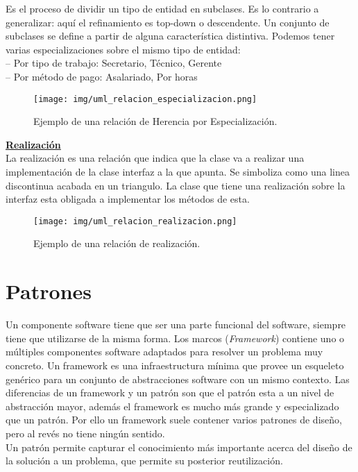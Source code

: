\documentclass[10pt,a4paper,titlepage]{article}
\begin{document}
Es el proceso de dividir un tipo de entidad en subclases. Es lo contrario a generalizar: aquí el refinamiento es top-down o descendente. Un conjunto de subclases se define a partir de alguna característica distintiva. Podemos tener varias especializaciones sobre el mismo tipo de entidad:\\
– Por tipo de trabajo: Secretario, Técnico, Gerente\\
– Por método de pago: Asalariado, Por horas

\begin{figure}[H] %
\centering
\texttt{[image: img/uml\_relacion\_especializacion.png]}
\caption{Ejemplo de una relación de Herencia por Especialización.} \label{fig:uml_rel_especializacion}
\end{figure}


\underline{\textbf{Realización}}\\
La realización es una relación que indica que la clase va a realizar una implementación de la clase interfaz a la que apunta. Se simboliza como una linea discontinua acabada en un triangulo. La clase que tiene una realización sobre la interfaz esta obligada a implementar los métodos de esta.
\begin{figure}[H] %
\centering
\texttt{[image: img/uml\_relacion\_realizacion.png]}
\caption{Ejemplo de una relación de realización.} \label{fig:uml_rel_realizacion}
\end{figure}


\section{Patrones}
Un componente software tiene que ser una parte funcional del software, siempre tiene que utilizarse de la misma forma. Los marcos (\textit{Framework}) contiene uno o múltiples componentes software adaptados para resolver un problema muy concreto. Un framework es una infraestructura mínima que provee un esqueleto genérico para un conjunto de abstracciones software con un mismo contexto. Las diferencias de un framework y un patrón son que el patrón esta a un nivel de abstracción mayor, además el framework es mucho más grande y especializado que un patrón. Por ello un framework suele contener varios patrones de diseño, pero al revés no tiene ningún sentido.\\

Un patrón permite capturar el conocimiento más importante acerca del diseño de la solución a un problema, que permite su posterior reutilización.\\
\end{document}
